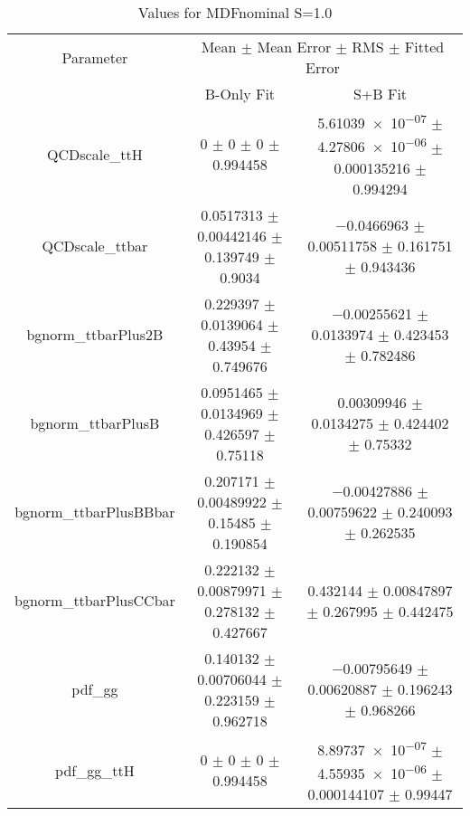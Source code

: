 \begin{table}
\centering
\caption{Values for MDFnominal S=1.0}
\begin{tabular}{ccc}
\toprule
Parameter & \multicolumn{2}{c}{Mean $\pm$ Mean Error $\pm$ RMS $\pm$ Fitted Error}\\
 & B-Only Fit & S+B Fit\\
\midrule
QCDscale\_ttH & \num{0} $\pm$ \num{0} $\pm$ \num{0} $\pm$ \num{0.994458} & \num{5.61039e-07} $\pm$ \num{4.27806e-06} $\pm$ \num{0.000135216} $\pm$ \num{0.994294}\\
QCDscale\_ttbar & \num{0.0517313} $\pm$ \num{0.00442146} $\pm$ \num{0.139749} $\pm$ \num{0.9034} & \num{-0.0466963} $\pm$ \num{0.00511758} $\pm$ \num{0.161751} $\pm$ \num{0.943436}\\
bgnorm\_ttbarPlus2B & \num{0.229397} $\pm$ \num{0.0139064} $\pm$ \num{0.43954} $\pm$ \num{0.749676} & \num{-0.00255621} $\pm$ \num{0.0133974} $\pm$ \num{0.423453} $\pm$ \num{0.782486}\\
bgnorm\_ttbarPlusB & \num{0.0951465} $\pm$ \num{0.0134969} $\pm$ \num{0.426597} $\pm$ \num{0.75118} & \num{0.00309946} $\pm$ \num{0.0134275} $\pm$ \num{0.424402} $\pm$ \num{0.75332}\\
bgnorm\_ttbarPlusBBbar & \num{0.207171} $\pm$ \num{0.00489922} $\pm$ \num{0.15485} $\pm$ \num{0.190854} & \num{-0.00427886} $\pm$ \num{0.00759622} $\pm$ \num{0.240093} $\pm$ \num{0.262535}\\
bgnorm\_ttbarPlusCCbar & \num{0.222132} $\pm$ \num{0.00879971} $\pm$ \num{0.278132} $\pm$ \num{0.427667} & \num{0.432144} $\pm$ \num{0.00847897} $\pm$ \num{0.267995} $\pm$ \num{0.442475}\\
pdf\_gg & \num{0.140132} $\pm$ \num{0.00706044} $\pm$ \num{0.223159} $\pm$ \num{0.962718} & \num{-0.00795649} $\pm$ \num{0.00620887} $\pm$ \num{0.196243} $\pm$ \num{0.968266}\\
pdf\_gg\_ttH & \num{0} $\pm$ \num{0} $\pm$ \num{0} $\pm$ \num{0.994458} & \num{8.89737e-07} $\pm$ \num{4.55935e-06} $\pm$ \num{0.000144107} $\pm$ \num{0.99447}\\
\bottomrule
\end{tabular}
\end{table}